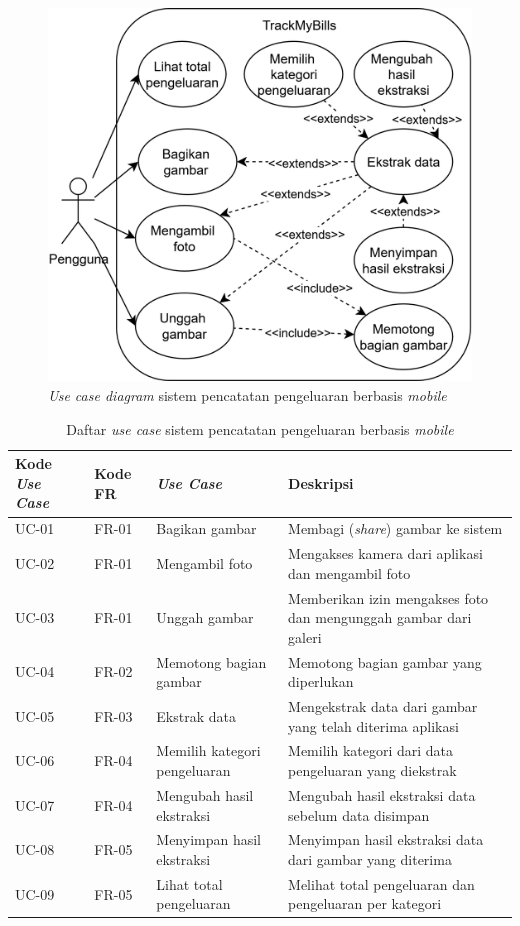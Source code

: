 \begin{figure}[htbp]
    \centering
    \includegraphics[width=.6\textwidth]{images/use-case-diagram.png}
    \caption{\emph{Use case diagram} sistem pencatatan pengeluaran berbasis \emph{mobile}}
    \label{fig:use-case-diagram}
\end{figure}

\begin{table}[h!]
\centering
\caption{Daftar \emph{use case} sistem pencatatan pengeluaran berbasis \emph{mobile}}
\label{tab:use-case-list}
\begin{tabularx}{\textwidth}{|p{1.6cm}|p{1.5cm}|p{2.8cm}|X|}
\hline
\textbf{Kode \emph{Use Case}} & \textbf{Kode FR} & \textbf{\emph{Use Case}} & \textbf{Deskripsi} \\ \hline
UC-01 & FR-01 & Bagikan gambar & Membagi (\emph{share}) gambar ke sistem \\ \hline
UC-02 & FR-01 & Mengambil foto & Mengakses kamera dari aplikasi dan mengambil foto \\ \hline
UC-03 & FR-01 & Unggah gambar & Memberikan izin mengakses foto dan mengunggah gambar dari galeri \\ \hline
UC-04 & FR-02 & Memotong bagian gambar & Memotong bagian gambar yang diperlukan \\ \hline
UC-05 & FR-03 & Ekstrak data & Mengekstrak data dari gambar yang telah diterima aplikasi \\ \hline
UC-06 & FR-04 & Memilih kategori pengeluaran & Memilih kategori dari data pengeluaran yang diekstrak \\ \hline
UC-07 & FR-04 & Mengubah hasil ekstraksi & Mengubah hasil ekstraksi data sebelum data disimpan \\ \hline
UC-08 & FR-05 & Menyimpan hasil ekstraksi & Menyimpan hasil ekstraksi data dari gambar yang diterima \\ \hline
UC-09 & FR-05 & Lihat total pengeluaran & Melihat total pengeluaran dan pengeluaran per kategori \\ \hline
\end{tabularx}
\end{table}